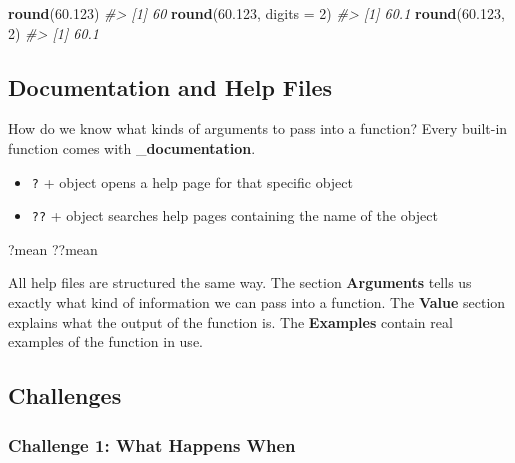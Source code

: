 \documentclass[]{book}
\newenvironment{Shaded}{\begin{snugshade}}{\end{snugshade}}
\newcommand{\CommentTok}[1]{\textcolor[rgb]{0.56,0.35,0.01}{\textit{#1}}}
\newcommand{\DataTypeTok}[1]{\textcolor[rgb]{0.13,0.29,0.53}{#1}}
\newcommand{\DecValTok}[1]{\textcolor[rgb]{0.00,0.00,0.81}{#1}}
\newcommand{\FloatTok}[1]{\textcolor[rgb]{0.00,0.00,0.81}{#1}}
\newcommand{\KeywordTok}[1]{\textcolor[rgb]{0.13,0.29,0.53}{\textbf{#1}}}
\newcommand{\NormalTok}[1]{#1}
\providecommand{\tightlist}{%
  \setlength{\itemsep}{0pt}\setlength{\parskip}{0pt}}
\begin{document}
\begin{Shaded}
\begin{Highlighting}[]
\KeywordTok{round}\NormalTok{(}\FloatTok{60.123}\NormalTok{)}
\CommentTok{#> [1] 60}
\KeywordTok{round}\NormalTok{(}\FloatTok{60.123}\NormalTok{, }\DataTypeTok{digits =} \DecValTok{2}\NormalTok{)}
\CommentTok{#> [1] 60.1}
\KeywordTok{round}\NormalTok{(}\FloatTok{60.123}\NormalTok{, }\DecValTok{2}\NormalTok{)}
\CommentTok{#> [1] 60.1}
\end{Highlighting}
\end{Shaded}

\hypertarget{documentation-and-help-files}{%
\subsection{Documentation and Help Files}\label{documentation-and-help-files}}

How do we know what kinds of arguments to pass into a function? Every built-in function comes with \_\textbf{documentation}.

\begin{itemize}
\tightlist
\item
  \texttt{?} + object opens a help page for that specific object
\item
  \texttt{??} + object searches help pages containing the name of the object
\end{itemize}

\begin{Shaded}
\begin{Highlighting}[]
\NormalTok{?mean}
\NormalTok{??mean}
\end{Highlighting}
\end{Shaded}

All help files are structured the same way. The section \textbf{Arguments} tells us exactly what kind of information we can pass into a function. The \textbf{Value} section explains what the output of the function is. The \textbf{Examples} contain real examples of the function in use.

\hypertarget{challenges-3}{%
\subsection{Challenges}\label{challenges-3}}

\hypertarget{challenge-1-what-happens-when}{%
\subsubsection*{Challenge 1: What Happens When}\label{challenge-1-what-happens-when}}
\end{document}
